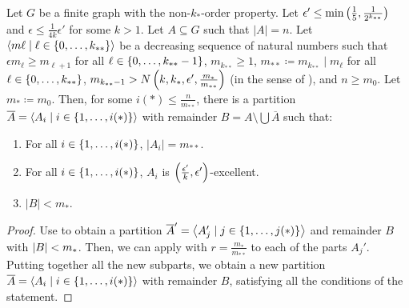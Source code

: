     \begin{lemma}[Claim 5.14.1a] \label{lem:existance_of_excellent_partition_with_equal_size}
        Let $G$ be a finite graph with the non-$k_{*}$-order property.
        Let $\epsilon' \leq \min \left( \frac{1}{5}, \frac{1}{2^{k_{**}}} \right)$ and $\epsilon \leq \frac{1}{4k} \epsilon'$ for some $k > 1$.
        Let $A \subseteq G$ such that $|A| = n$.
        Let $\left< m\ell \mid \ell \in \left\{ 0, \dots, k_{**} \right\} \right>$ be a decreasing sequence of natural numbers such that
        $\epsilon m_{\ell} \geq m_{\ell+1}$ for all $\ell \in \left\{ 0, \dots, k_{**}-1 \right\}$, $m_{k_{**}} \geq 1$,
        $m_{**} \coloneq m_{k_{**}} \mid m_\ell$ for all $\ell \in \left\{ 0, \dots, k_{**} \right\}$,
        $m_{k_{**}-1} > N\left( k, k_*, \epsilon', \frac{m_*}{m_{**}} \right)$
        (in the sense of ), and $n \geq m_0$.
        Let $m_* \coloneq m_0$.
        Then, for some $i(*) \leq \frac{n}{m_{**}}$, there is a partition $\overline{A} = \left< A_i \mid i \in \left\{ 1, \dots, i(*) \right\} \right>$
        with remainder $B = A \setminus \bigcup \overline{A}$ such that:
        \begin{enumerate}[label=(\alph*), ref=\alph*]
            \item \label{itm:existance_of_excellent_partition_with_equal_size.a} For all $i \in \left\{ 1, \dots, i(*) \right\}$, $|A_i| = m_{**}$.
            \item \label{itm:existance_of_excellent_partition_with_equal_size.c} For all $i \in \left\{ 1, \dots, i(*) \right\}$, $A_i$ is $\left( \frac{\epsilon'}{k}, \epsilon' \right)$-excellent.
            \item \label{itm:existance_of_excellent_partition_with_equal_size.d} $|B| < m_*$.
        \end{enumerate}
        \begin{proof}
            Use  to obtain a partition
            $\overline{A}' = \left< A_j' \mid j \in \left\{ 1, \dots, j(*) \right\} \right>$ and remainder $B$ with $\left| B \right| < m_*$.
            Then, we can apply  with $r = \frac{m_*}{m_{**}}$ to each of
            the parts $A_j'$.
            Putting together all the new subparts, we obtain a new partition $\overline{A} = \left< A_i \mid i \in \left\{ 1, \dots, i(*) \right\} \right>$
            with remainder $B$, satisfying all the conditions of the statement.
        \end{proof}
    \end{lemma}

